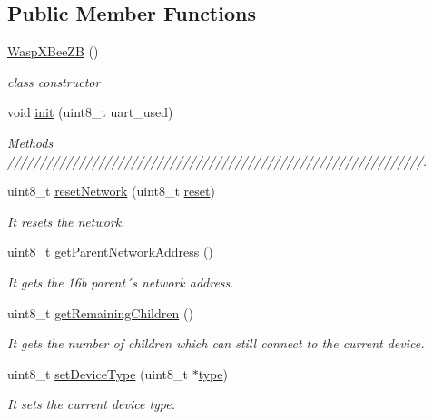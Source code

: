\subsection*{Public Member Functions}
\begin{DoxyCompactItemize}
\item 
\hyperlink{class_wasp_x_bee_z_b_ab80a736ef957fc9eac040ec67be11f11}{Wasp\+X\+Bee\+ZB} ()
\begin{DoxyCompactList}\small\item\em class constructor \end{DoxyCompactList}\item 
void \hyperlink{class_wasp_x_bee_z_b_a065c5f6d9bd14de389314f78d9dfae22}{init} (uint8\+\_\+t uart\+\_\+used)
\begin{DoxyCompactList}\small\item\em Methods ////////////////////////////////////////////////////////////////. \end{DoxyCompactList}\item 
uint8\+\_\+t \hyperlink{class_wasp_x_bee_z_b_a4197985ee551498c9b5301e4b44625d7}{reset\+Network} (uint8\+\_\+t \hyperlink{class_wasp_x_bee_core_adb05ad7b2a13f1bea8dc219282e3ba50}{reset})
\begin{DoxyCompactList}\small\item\em It resets the network. \end{DoxyCompactList}\item 
uint8\+\_\+t \hyperlink{class_wasp_x_bee_z_b_a22772ea96f7e8886ddcd2f1c643a9851}{get\+Parent\+Network\+Address} ()
\begin{DoxyCompactList}\small\item\em It gets the 16b parent´s network address. \end{DoxyCompactList}\item 
uint8\+\_\+t \hyperlink{class_wasp_x_bee_z_b_a231e01bb7b9b2d240c1787ea8acfc32c}{get\+Remaining\+Children} ()
\begin{DoxyCompactList}\small\item\em It gets the number of children which can still connect to the current device. \end{DoxyCompactList}\item 
uint8\+\_\+t \hyperlink{class_wasp_x_bee_z_b_a2dae6efc2c69806a2ad02555780e53ee}{set\+Device\+Type} (uint8\+\_\+t $\ast$\hyperlink{_sd_fat_structs_8h_a1d127017fb298b889f4ba24752d08b8e}{type})
\begin{DoxyCompactList}\small\item\em It sets the current device type. \end{DoxyCompactList}\item 

\end{DoxyCompactItemize}
